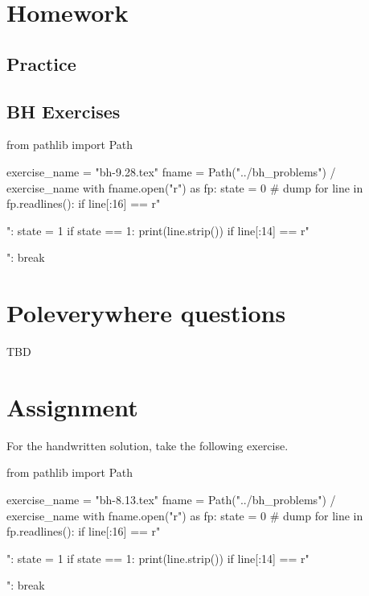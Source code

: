 \section{Homework}

\label{sec:homework}

\subsection{Practice}
\label{sec:practice}



\subsection{BH Exercises}
\label{sec:bh-exercises-1}

\begin{pycode}
from pathlib import Path

exercise_name = "bh-9.28.tex"
fname = Path("../bh_problems") / exercise_name
with fname.open("r") as fp:
    state = 0  # dump
    for line in fp.readlines():
        if line[:16] == r"\begin{exercise}":
            state = 1
        if state == 1:
            print(line.strip())
        if line[:14] == r"\end{exercise}":
            break
\end{pycode}



\section{Poleverywhere questions}
\label{sec:polev-quest}


TBD


\section{Assignment}
\label{sec:assignment}

For the handwritten solution, take the following exercise.

\begin{pycode}
from pathlib import Path

exercise_name = "bh-8.13.tex"
fname = Path("../bh_problems") / exercise_name
with fname.open("r") as fp:
    state = 0  # dump
    for line in fp.readlines():
        if line[:16] == r"\begin{exercise}":
            state = 1
        if state == 1:
            print(line.strip())
        if line[:14] == r"\end{exercise}":
            break
\end{pycode}








